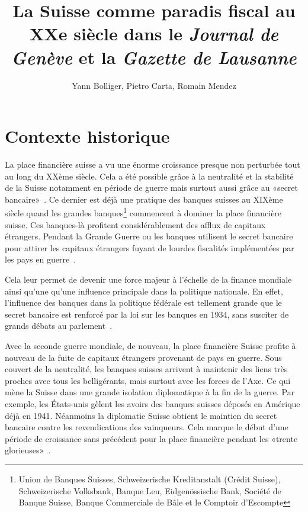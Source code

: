 \documentclass[11pt]{article}
\title{La Suisse comme paradis fiscal au XXe siècle dans le
\textit{Journal de Genève} et la \textit{Gazette de Lausanne}}
\author{Yann Bolliger, Pietro Carta, Romain Mendez}
\begin{document}
\maketitle

\section{Contexte historique}

La place financière suisse a vu une énorme croissance presque non perturbée tout
au long du XXème siècle. Cela a été possible grâce à la neutralité et la
stabilité de la Suisse notamment en période de guerre mais surtout aussi grâce
au «secret bancaire»~\citep[p. 512]{Mazbouri12}. Ce dernier
est déjà une pratique des banques suisses au XIXème siècle quand les grandes
banques\footnote{Union de Banques Suisses, Schweizerische Kreditanstalt (Crédit
Suisse), Schweizerische Volksbank, Banque Leu, Eidgenössische Bank, Société de
Banque Suisse, Banque Commerciale de Bâle et le Comptoir d’Escompte} commencent
à dominer la place financière suisse. Ces banques-là profitent considérablement
des afflux de capitaux étrangers. Pendant la Grande Guerre ou les banques utilisent
le secret bancaire pour attirer les capitaux étrangers fuyant de lourdes
fiscalités implémentées par les pays en guerre~\citep[p. 484-486]{Mazbouri12}.

Cela leur permet de devenir une force majeur à l’échelle de la finance mondiale
ainsi qu’une qu’une influence principale dans la politique nationale. En effet,
l’influence des banques dans la politique fédérale est tellement grande que
le secret bancaire est renforcé par la loi sur les banques en 1934, sans
susciter de grands débats au parlement~\citep{Guex99}. 

Avec la seconde guerre mondiale, de nouveau, la place financière Suisse profite
à nouveau de la fuite de capitaux étrangers provenant de pays en guerre. Sous
couvert de la neutralité, les banques suisses arrivent à maintenir des liens
très proches avec tous les belligérants, mais surtout avec les forces de l’Axe.
Ce qui mène la Suisse dans une grande isolation diplomatique à la fin de la
guerre. Par exemple, les États-unis gèlent les avoirs des banques suisses
déposés en Amérique déjà en 1941. Néanmoins la diplomatie Suisse obtient le
maintien du secret bancaire contre les revendications des vainqueurs. Cela
marque le début d’une période de croissance sans précédent pour la place
financière pendant les «trente glorieuses»~\citep[p. 495]{Mazbouri12}.
\end{document}

